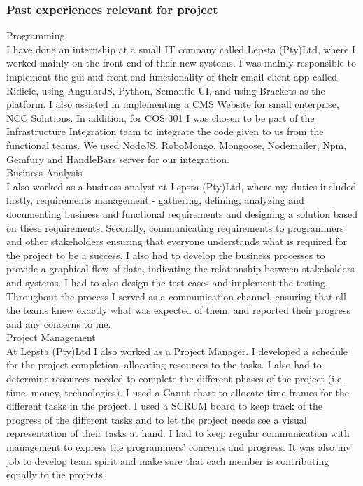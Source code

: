 \documentclass[hidelinks, 12pt, oneside]{article}
\begin{document}
\subsubsection{Past experiences relevant for project}
Programming \\
I have done an internship at a small IT company called Lepsta (Pty)Ltd, where I worked mainly on the front end of their new systems. I was mainly responsible to implement the gui and front end functionality of their email client app called Ridicle, using AngularJS, Python, Semantic UI, and using Brackets as the platform.
I also assisted in implementing a CMS Website for small enterprise, NCC Solutions. In addition, for COS 301 I was chosen to be part of the Infrastructure Integration team to integrate the code given to us from the functional teams. We used NodeJS, RoboMongo, Mongoose, Nodemailer, Npm, Gemfury and HandleBars server for our integration. \\

Business Analysis \\
I also worked as a business analyst at Lepsta (Pty)Ltd, where my duties included firstly, requirements management - gathering, defining, analyzing and documenting business and functional requirements and designing a solution based on these requirements. Secondly, communicating requirements to programmers and other stakeholders ensuring that everyone understands what is required for the project to be a success. I also had to develop the business processes to provide a graphical flow of data, indicating the relationship between stakeholders and systems. I had to also design the test cases and implement the testing. Throughout the process I served as a communication channel, ensuring that all the teams knew exactly what was expected of them, and reported their progress and any concerns to me.
\\
Project Management \\
At Lepsta (Pty)Ltd I also worked as a Project Manager. I developed a schedule for the project completion, allocating resources to the tasks. I also had to determine resources needed to complete the different phases of the project (i.e. time, money, technologies). I used a Gannt chart to allocate time frames for the different tasks in the project. I used a SCRUM board to keep track of the progress of the different tasks and to let the project needs see a visual representation of their tasks at hand. I had to keep regular communication with management to express the programmers' concerns and progress. It was also my job to develop team spirit and make sure that each member is contributing equally to the projects. \\
 
\end{document}
